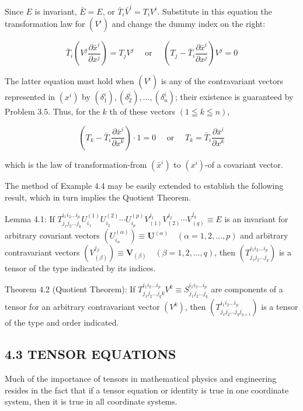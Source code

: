 \documentclass[10pt]{article}
\begin{document}
Since $E$ is invariant, $\bar{E}=E$, or $\bar{T}_{i} \bar{V}^{i}=T_{i} V^{i}$. Substitute in this equation the transformation law for $\left(V^{i}\right)$ and change the dummy index on the right:

$$
\bar{T}_{i}\left(V^{j} \frac{\partial \bar{x}^{i}}{\partial x^{j}}\right)=T_{j} V^{j} \quad \text { or } \quad\left(T_{j}-\bar{T}_{i} \frac{\partial \bar{x}^{i}}{\partial x^{j}}\right) V^{j}=0
$$

The latter equation must hold when $\left(V^{i}\right)$ is any of the contravariant vectors represented in $\left(x^{i}\right)$ by $\left(\delta_{1}^{i}\right),\left(\delta_{2}^{i}\right), \ldots,\left(\delta_{n}^{i}\right)$; their existence is guaranteed by Problem 3.5. Thus, for the $k$ th of these vectors $(1 \leqq k \leqq n)$,

$$
\left(T_{k}-\bar{T}_{i} \frac{\partial \bar{x}^{i}}{\partial x^{k}}\right) \cdot 1=0 \quad \text { or } \quad T_{k}=\bar{T}_{i} \frac{\partial \bar{x}^{i}}{\partial x^{k}}
$$

which is the law of transformation-from $\left(\bar{x}^{i}\right)$ to $\left(x^{i}\right)$-of a covariant vector.

The method of Example 4.4 may be easily extended to establish the following result, which in turn implies the Quotient Theorem.

Lemma 4.1: If $T_{j_{1} j_{2} \ldots j_{q}}^{i_{1} i_{2} \ldots i_{p}} U_{i_{1}}^{(1)} U_{i_{2}}^{(2)} \cdots U_{i_{p}}^{(p)} V_{(1)}^{j_{1}} V_{(2)}^{j_{2}} \cdots V_{(q)}^{j_{q}} \equiv E$ is an invariant for arbitrary covariant vectors $\left(U_{i_{\alpha}}^{(\alpha)}\right) \equiv \mathbf{U}^{(\alpha)} \quad(\alpha=1,2, \ldots, p)$ and arbitrary contravariant vectors $\left(V_{(\beta)}^{j_{\beta}}\right) \equiv \mathbf{V}_{(\beta)} \quad(\beta=1,2, \ldots, q)$, then $\left(T_{j_{1} j_{2} \ldots j_{q}}^{i_{1} i_{2} \ldots i_{p}}\right)$ is a tensor of the type indicated by its indices.

Theorem 4.2 (Quotient Theorem): If $T_{j_{1} j_{2} \ldots j_{q} k}^{i_{1} i_{2} \ldots i_{p}} V^{k} \equiv S_{j_{1} j_{2} \ldots j_{q}}^{i_{1} i_{2} \ldots i_{p}}$ are components of a tensor for an arbitrary contravariant vector $\left(V^{k}\right)$, then $\left(T_{j_{1} j_{2} \ldots j_{q} j_{q+1}}^{i_{1} i_{2} \ldots i_{p}}\right)$ is a tensor of the type and order indicated.

\subsection*{4.3 TENSOR EQUATIONS}
Much of the importance of tensors in mathematical physics and engineering resides in the fact that if a tensor equation or identity is true in one coordinate system, then it is true in all coordinate systems.
\end{document}
